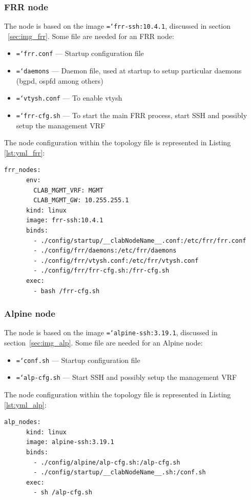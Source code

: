\documentclass{report}
\newcommand{\monospaced}[1]{\texttt{\hyphenchar\font=`\-#1}}
\begin{document}
\subsubsection{FRR node} 
The node is based on the image \monospaced{frr-ssh:10.4.1}, discussed in section ~\ref{sec:img_frr}. Some file are needed for an FRR node: 
\begin{itemize}
    \item \monospaced{frr.conf} --- Startup configuration file
    \item \monospaced{daemons} --- Daemon file, used at startup to setup particular daemons (bgpd, ospfd among others)
    \item \monospaced{vtysh.conf} --- To enable vtysh
    \item \monospaced{frr-cfg.sh} --- To start the main FRR process, start SSH and possibly setup the management VRF
\end{itemize}
The node configuration within the topology file is represented in Listing \ref{lst:yml_frr}:
\begin{lstlisting}[style=styleYml, caption=FRR node definition, label=lst:yml_frr]
    frr_nodes:
      env:
        CLAB_MGMT_VRF: MGMT
        CLAB_MGMT_GW: 10.255.255.1
      kind: linux
      image: frr-ssh:10.4.1
      binds:
        - ./config/startup/__clabNodeName__.conf:/etc/frr/frr.conf
        - ./config/frr/daemons:/etc/frr/daemons
        - ./config/frr/vtysh.conf:/etc/frr/vtysh.conf
        - ./config/frr/frr-cfg.sh:/frr-cfg.sh
      exec:
        - bash /frr-cfg.sh
\end{lstlisting}
\subsubsection{Alpine node} 
The node is based on the image \monospaced{alpine-ssh:3.19.1}, discussed in section~\ref{sec:img_alp}. Some file are needed for an Alpine node: 
\begin{itemize}
    \item \monospaced{conf.sh} --- Startup configuration file
    \item \monospaced{alp-cfg.sh} --- Start SSH and possibly setup the management VRF
\end{itemize}
The node configuration within the topology file is represented in Listing \ref{lst:yml_alp}:
\begin{lstlisting}[style=styleYml, caption=Alpine node definition, label=lst:yml_alp]
    alp_nodes:
      kind: linux
      image: alpine-ssh:3.19.1
      binds:
        - ./config/alpine/alp-cfg.sh:/alp-cfg.sh
        - ./config/startup/__clabNodeName__.sh:/conf.sh
      exec:
        - sh /alp-cfg.sh
\end{lstlisting}
\end{document}
